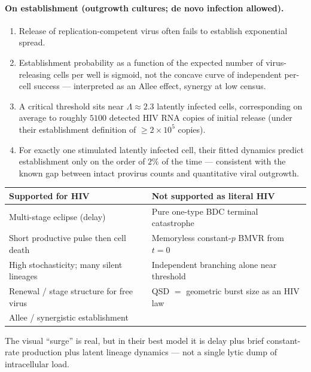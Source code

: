 \paragraph{On establishment (outgrowth cultures; de novo infection
allowed).}
\begin{enumerate}
\item Release of replication-competent virus often fails to establish
exponential spread.
\item Establishment probability as a function of the expected number of
virus-releasing cells per well is sigmoid, not the concave curve of
independent per-cell success --- interpreted as an Allee effect, synergy at
low census.
\item A critical threshold sits near $\Lambda\approx2.3$ latently infected
cells, corresponding on average to roughly $5100$ detected HIV RNA copies
of initial release (under their establishment definition of
$\ge2\times10^5$ copies).
\item For exactly one stimulated latently infected cell, their fitted
dynamics predict establishment only on the order of $2\%$ of the time ---
consistent with the known gap between intact provirus counts and
quantitative viral outgrowth.
\end{enumerate}

\begin{center}
\renewcommand{\arraystretch}{1.25}
\small
\begin{tabular}{@{}p{}p{}@{}}
\toprule
Supported for HIV & Not supported as literal HIV \\
\midrule
Multi-stage eclipse (delay) & Pure one-type BDC terminal catastrophe \\
Short productive pulse then cell death & Memoryless constant-$p$ BMVR from $t=0$ \\
High stochasticity; many silent lineages & Independent branching alone near threshold \\
Renewal / stage structure for free virus & QSD $=$ geometric burst size as an HIV law \\
Allee / synergistic establishment & \\
\bottomrule
\end{tabular}
\end{center}
The visual ``surge'' is real, but in their best model it is delay plus
brief constant-rate production plus latent lineage dynamics --- not a
single lytic dump of intracellular load.

